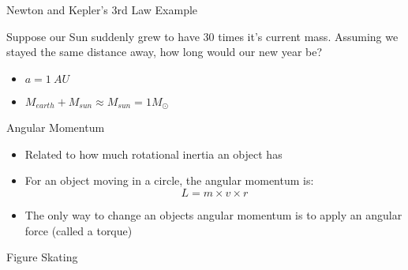 \documentclass[pdf, aspectratio=169]{beamer}
\begin{document}
\begin{frame}{Newton and Kepler's 3rd Law Example}
  \begin{example}
	Suppose our Sun suddenly grew to have 30 times it's current mass. Assuming we stayed the same distance away, how long would our new year be?
	\begin{itemize}
	  \item $a = \SI{1}{AU}$
	  \item $M_{earth} + M_{sun} \approx M_{sun} = 1M_\odot$
	\end{itemize}
  \end{example}
\end{frame}

\begin{frame}{Angular Momentum}
  \begin{itemize}
	\item Related to how much rotational inertia an object has
	\item For an object moving in a circle, the \alert{angular momentum} is:
	  \[L = m\times v \times r\]
	\item The only way to change an objects angular momentum is to apply an angular force (called a torque)
  \end{itemize}
  \begin{center}
  \end{center}
\end{frame}

\begin{frame}{Figure Skating}
	\begin{center}
	\end{center}
\end{frame}
\end{document}
